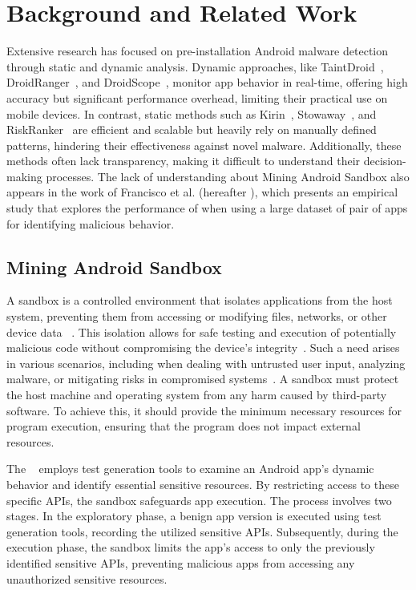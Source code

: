 \section{Background and Related Work}\label{sec:background}

Extensive research has focused on pre-installation Android malware detection through static and dynamic analysis. Dynamic approaches, like TaintDroid~\cite{DBLP:conf/osdi/EnckGCCJMS10}, DroidRanger~\cite{Zhou2012HeyYG}, and DroidScope~\cite{LKYanDroidscope}, monitor app behavior in real-time, offering high accuracy but significant performance overhead, limiting their practical use on mobile devices. In contrast, static methods such as Kirin~\cite{Enck2009}, Stowaway~\cite{DBLP:conf/ccs/FeltCHSW11}, and RiskRanker~\cite{GraceRiskranker2012} are efficient and scalable but heavily rely on manually defined patterns, hindering their effectiveness against novel malware. Additionally, these methods often lack transparency, making it difficult to understand their decision-making processes. The lack of understanding about Mining Android Sandbox also appears in the work of Francisco et al. (hereafter \fhc), which presents an empirical study that explores the performance of \mas when using a large dataset of pair of apps for identifying malicious behavior.

\subsection{Mining Android Sandbox}

A sandbox is a controlled environment that isolates applications from the host system, preventing them from accessing or modifying files, networks, or other device data ~\cite{DBLP:journals/peerj-cs/MaassSCS16}. This isolation allows for safe testing and execution of potentially malicious code without compromising the device's integrity~\cite{DBLP:conf/esorics/BordoniCS17}. Such a need arises in various scenarios, including when dealing with untrusted user input, analyzing malware, or mitigating risks in compromised systems~\cite{DBLP:journals/peerj-cs/MaassSCS16}. A sandbox must protect the host machine and operating system from any harm caused by third-party software. To achieve this, it should provide the minimum necessary resources for program execution, ensuring that the program does not impact external resources.

The \mas ~\cite{DBLP:conf/icse/JamrozikSZ16} employs test generation tools to examine an Android app's dynamic behavior and identify essential sensitive resources. By restricting access to these specific APIs, the sandbox safeguards app execution. The process involves two stages. In the exploratory phase, a benign app version is executed using test generation tools, recording the utilized sensitive APIs. Subsequently, during the execution phase, the sandbox limits the app's access to only the previously identified sensitive APIs, preventing malicious apps from accessing any unauthorized sensitive resources.

